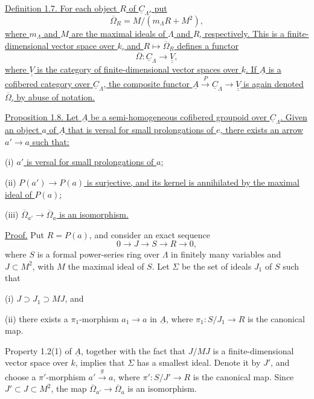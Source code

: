 
\underline{Definition 1.7. For each object $R$ of
$\underline C_\Lambda$, put}
\[
 \overline\Omega_R=M/(m_\Lambda R+M^2),
\]
\underline{where $m_\Lambda$ and $M$ are the maximal ideals of
$\Lambda$ and $R$, respectively. This is a finite-dimensional vector
space over $k$, and $R\longmapsto\overline\Omega_R$ defines a functor}
\[
 \overline\Omega:\underline C_\Lambda
   \longrightarrow\underline{\underline V},
\]
\underline{where $\underline{\underline V}$ is the category of
finite-dimensional vector spaces over $k$. If $\underline A$ is a
cofibered category over $\underline C_\Lambda$, the composite functor
$\underline A\xrightarrow P\underline C_\Lambda
\longrightarrow\underline{\underline V}$ is again denoted
$\overline\Omega$, by abuse of notation.}

\underline{Proposition 1.8. Let $\underline A$ be a semi-homogeneous
cofibered groupoid over $\underline C_\Lambda$. Given an object $a$ of
$\underline A$ that is versal for small prolongations of $e$, there
exists an arrow $a'\longrightarrow a$ such that:}


(i) \underline{$a'$ is versal for small prolongations of $a$;}

(ii) \underline{$P(a')\longrightarrow P(a)$ is surjective, and its
kernel is annihilated by the maximal ideal of $P(a)$;}

(iii) \underline{$\overline\Omega_{a'}\longrightarrow
\overline\Omega_a$ is an isomorphism.}

\underline{Proof.} Put $R=P(a)$, and consider an exact sequence
\[
 0\longrightarrow J\longrightarrow S\longrightarrow R
 \longrightarrow0,
\]
where $S$ is a formal power-series ring over $\Lambda$ in finitely
many variables and $J\subset M^2$, with $M$ the maximal ideal of $S$.
Let $\Sigma$ be the set of ideals $J_1$ of $S$ such that

(i) $J\supset J_1\supset MJ$, and

(ii) there exists a $\pi_1$-morphism $a_1\longrightarrow a$ in
$\underline A$, where $\pi_1:S/J_1\longrightarrow R$ is the canonical
map.

Property 1.2(1) of $\underline A$, together with the fact that $J/MJ$
is a finite-dimensional vector space over $k$, implies that $\Sigma$
has a smallest ideal. Denote it by $J'$, and choose a
$\pi'$-morphism $a'\xrightarrow g a$, where
$\pi':S/J'\longrightarrow R$ is the canonical map. Since
$J'\subset J\subset M^2$, the map
$\overline\Omega_{a'}\longrightarrow\overline\Omega_a$ is an
isomorphism.

